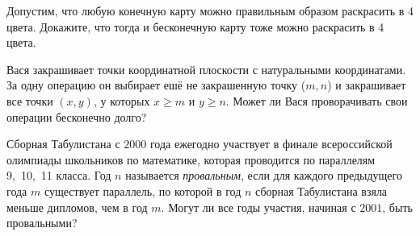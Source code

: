 \begin{problems}
\item Допустим, что любую конечную карту можно правильным образом раскрасить в 4 цвета. Докажите, что тогда и бесконечную карту тоже можно раскрасить в 4 цвета.

\item Вася закрашивает точки координатной плоскости с натуральными координатами. За одну операцию он выбирает ешё не закрашенную точку ($m, n$) и закрашивает все точки $(x, y)$, у которых $x \geq m$ и $y \geq n$. Может ли Вася проворачивать свои операции бесконечно долго?

\item Сборная Табулистана с $2000$ года ежегодно участвует в финале всероссийской олимпиады школьников по математике, которая проводится по параллелям 9,~10,~11 класса. Год $n$ называется \emph{провальным}, если для каждого предыдущего года $m$ существует параллель, по которой в год $n$ сборная Табулистана взяла меньше дипломов, чем в год $m$. Могут ли все годы участия, начиная с $2001$, быть провальными?






\end{problems}
